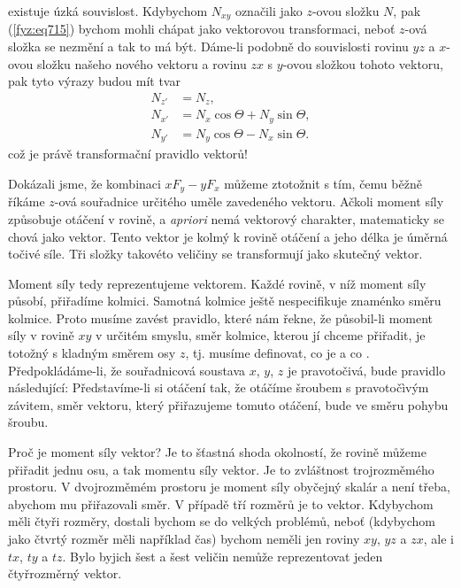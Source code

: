     existuje úzká souvislost. Kdybychom \(N_{xy}\) označili jako \(z\)-ovou složku \(N\), pak
    (\ref{fyz:eq715}) bychom mohli chápat jako vektorovou transformaci, neboť \(z\)-ová složka se
    nezmění a tak to má být. Dáme-li podobně do souvislosti rovinu \(yz\) a \(x\)-ovou složku našeho
    nového vektoru a rovinu \(zx\) s \(y\)-ovou složkou tohoto vektoru, pak tyto výrazy budou mít
    tvar
    \begin{subequations}\label{fyz:eq717}
      \begin{align}
        N_{z'} &=  N_z,                           \label{fyz:eq717a}  \\
        N_{x'} &=  N_x\cos\Theta + N_y\sin\Theta, \label{fyz:eq717b}  \\
        N_{y'} &=  N_y\cos\Theta - N_x\sin\Theta. \label{fyz:eq717c}        
      \end{align}
    \end{subequations} 
    což je právě transformační pravidlo vektorů!

    Dokázali jsme, že kombinaci \(xF_y - yF_x\) můžeme ztotožnit s tím, čemu běžně říkáme \(z\)-ová
    souřadnice určitého uměle zavedeného vektoru. Ačkoli moment síly způsobuje otáčení v rovině, a
    \emph{apriori} nemá vektorový charakter, matematicky se chová jako vektor. Tento vektor je kolmý
    k rovině otáčení a jeho délka je úměrná točivé síle. Tři složky takovéto veličiny se
    transformují jako skutečný vektor.

    Moment síly tedy reprezentujeme vektorem. Každé rovině, v níž moment síly působí, přiřadíme
    kolmici. Samotná kolmice ještě nespecifikuje znaménko směru kolmice. Proto musíme zavést
    pravidlo, které nám řekne, že působil-li moment síly v rovině \(xy\) v určitém smyslu, směr
    kolmice, kterou jí chceme přiřadit, je totožný s kladným směrem osy \(z\), tj. musíme definovat,
    co je  a co . Předpokládáme-li, že souřadnicová soustava \(x\), \(y\), \(z\)
    je pravotočivá, bude pravidlo následující: Představíme-li si otáčení tak, že otáčíme šroubem s
    pravotočìvým závitem, směr vektoru, který přiřazujeme tomuto otáčení, bude ve směru pohybu
    šroubu.

    Proč je moment síly vektor? Je to šťastná shoda okolností, že rovině můžeme přiřadit jednu osu,
    a tak momentu síly vektor. Je to zvláštnost trojrozměmého prostoru. V dvojrozměmém prostoru je
    moment síly obyčejný skalár a není třeba, abychom mu přiřazovali směr. V případě tří rozměrů je
    to vektor. Kdybychom měli čtyři rozměry, dostali bychom se do velkých problémů, neboť (kdybychom
    jako čtvrtý rozměr měli například čas) bychom neměli jen roviny \(xy\), \(yz\) a \(zx\), ale i
    \(tx\), \(ty\) a \(tz\). Bylo byjich šest a šest veličin nemůže reprezentovat jeden čtyřrozměrný
    vektor.

